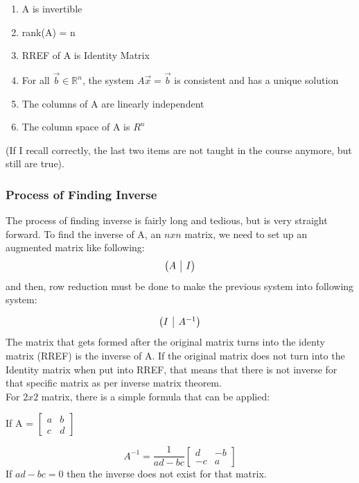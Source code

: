 \documentclass[12pt]{article}
\makeatletter
\newcommand{\R}{\mathbb{R}}
\newenvironment{amatrix}[1]{%
  \left(\begin{array}{@{}*{#1}{c}|c@{}}
}{%
  \end{array}\right)
}
\makeatother
\begin{document}
\begin{enumerate}
\item{A is invertible}
\item{rank(A) = n}
\item{RREF of A is Identity Matrix}
\item{For all $\vec{b} \in \R^n$, the system $A\vec{x}=\vec{b}$ is consistent and has a unique solution}
\item{The columns of A are linearly independent}
\item{The column space of A is $R^n$}
\end{enumerate}
(If I recall correctly, the last two items are not taught in the course anymore, but still are true).

\subsubsection{Process of Finding Inverse}
The process of finding inverse is fairly long and tedious, but is very straight forward. To find the inverse of A, an $nxn$ matrix, we need to set up an augmented matrix like following:\\
\begin{equation}
\begin{amatrix}{1}
   A & I \\
 \end{amatrix}
\end{equation}
and then, row reduction must be done to make the previous system into following system:

\begin{equation}
\begin{amatrix}{1}
   I & A^{-1} \\
 \end{amatrix}
\end{equation}
The matrix that gets formed after the original matrix turns into the identy matrix (RREF) is the inverse of A. If the original matrix does not turn into the Identity matrix when put into RREF, that means that there is not inverse for that specific matrix as per inverse matrix theorem.\\
For $2x2$ matrix, there is a simple formula that can be applied:\\
\begin{center}
If A = $\begin{bmatrix}a & b\\c & d\end{bmatrix}$
\end{center}
\begin{equation}
A^{-1} = \frac{1}{ad-bc}\begin{bmatrix}d & -b\\-c & a\end{bmatrix}
\end{equation}
If ${ad-bc} = 0$ then the inverse does not exist for that matrix.
\end{document}
